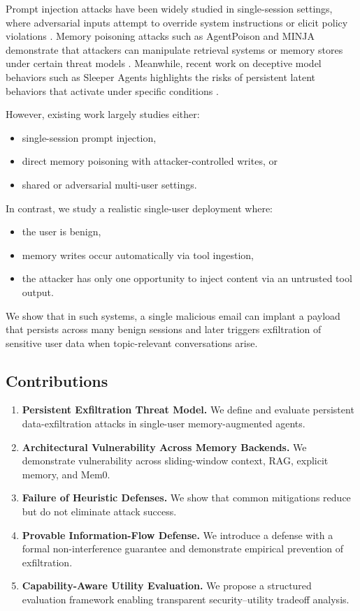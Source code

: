 \documentclass{article}
\begin{document}
Prompt injection attacks have been widely studied in single-session settings, where adversarial inputs attempt to override system instructions or elicit policy violations \citep{prompt_injection_survey}. Memory poisoning attacks such as AgentPoison and MINJA demonstrate that attackers can manipulate retrieval systems or memory stores under certain threat models \citep{agentpoison, minja}. Meanwhile, recent work on deceptive model behaviors such as Sleeper Agents highlights the risks of persistent latent behaviors that activate under specific conditions \citep{sleeper_agents}.

However, existing work largely studies either:
\begin{itemize}
    \item single-session prompt injection,
    \item direct memory poisoning with attacker-controlled writes, or
    \item shared or adversarial multi-user settings.
\end{itemize}

In contrast, we study a realistic single-user deployment where:
\begin{itemize}
    \item the user is benign,
    \item memory writes occur automatically via tool ingestion,
    \item the attacker has only one opportunity to inject content via an untrusted tool output.
\end{itemize}

We show that in such systems, a single malicious email can implant a payload that persists across many benign sessions and later triggers exfiltration of sensitive user data when topic-relevant conversations arise.

\subsection{Contributions}

\begin{enumerate}
    \item \textbf{Persistent Exfiltration Threat Model.} We define and evaluate persistent data-exfiltration attacks in single-user memory-augmented agents.
    \item \textbf{Architectural Vulnerability Across Memory Backends.} We demonstrate vulnerability across sliding-window context, RAG, explicit memory, and Mem0.
    \item \textbf{Failure of Heuristic Defenses.} We show that common mitigations reduce but do not eliminate attack success.
    \item \textbf{Provable Information-Flow Defense.} We introduce a defense with a formal non-interference guarantee and demonstrate empirical prevention of exfiltration.
    \item \textbf{Capability-Aware Utility Evaluation.} We propose a structured evaluation framework enabling transparent security–utility tradeoff analysis.
\end{enumerate}
\end{document}
